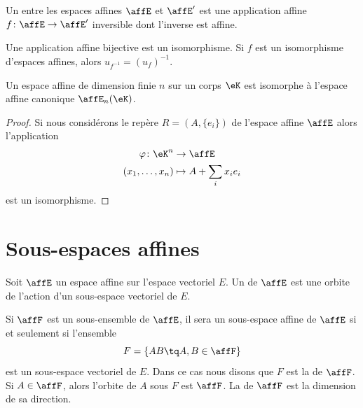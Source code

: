 \begin{definition}
	Un  entre les espaces affines \( \affE\) et \( \affE'\) est une application affine \( f\colon \affE\to \affE'\) inversible dont l'inverse est affine.
\end{definition}

\begin{proposition} \label{PropxtFeDE}
	Une application affine bijective est un isomorphisme. Si \( f\) est un isomorphisme d'espaces affines, alors \( u_{f^{-1}}=(u_f)^{-1}\).
\end{proposition}

\begin{proposition}
	Un espace affine de dimension finie \( n\) sur un corps \( \eK\) est isomorphe à l'espace affine canonique \( \affE_n(\eK)\).
\end{proposition}

\begin{proof}
	Si nous considérons le repère \( R=(A,\{ e_i \})\) de l'espace affine \( \affE\) alors l'application
	\begin{equation}
		\begin{aligned}
			\varphi\colon \eK^n & \to \affE              \\
			(x_1,\ldots,x_n)    & \mapsto A+\sum_ix_ie_i
		\end{aligned}
	\end{equation}
	est un isomorphisme.
\end{proof}

\section{Sous-espaces affines}

\begin{definition}      \label{DEFooJSUHooJjtpwz}
	Soit \( \affE\) un espace affine sur l'espace vectoriel \( E\). Un  de \( \affE\) est une orbite de l'action d'un sous-espace vectoriel de \( E\).
\end{definition}

Si \( \affF\) est un sous-ensemble de \( \affE\), il sera un sous-espace affine de \( \affE\) si et seulement si l'ensemble
\begin{equation}
	F=\{ AB\tq A,B\in\affF \}
\end{equation}
est un sous-espace vectoriel de \( E\). Dans ce cas nous disons que \( F\) est la  de \( \affF\). Si \( A\in\affF\), alors l'orbite de \( A\) sous \( F\) est \( \affF\). La  de \( \affF\) est la dimension de sa direction.

